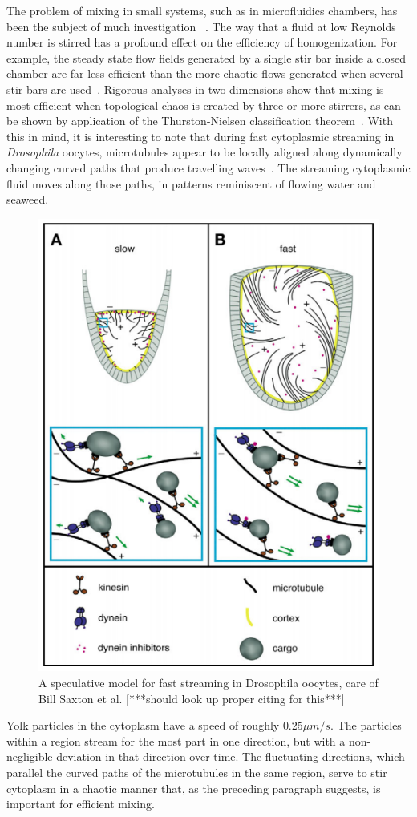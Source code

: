 \documentclass[11pt]{ucthesis}
\begin{document}
The problem of mixing in small systems, such as in microfluidics
chambers, has been the subject of much investigation ~\cite{Squires}. The
way that a fluid at low Reynolds number is stirred has a
profound effect on the efficiency of homogenization. For
example,  the steady state flow fields generated by a single
stir bar inside a closed chamber are far less efficient than
the more chaotic flows generated when  several stir bars are used~\cite{Aref,Aref2000}.
Rigorous analyses in two dimensions show that mixing is
most efficient when topological chaos is created by three or more
stirrers, as can be shown by application of the Thurston-Nielsen
classification theorem~\cite{Thurston,Fathi,Handel}.  With this in mind, it is
interesting to note that during fast cytoplasmic streaming in
{\em Drosophila} oocytes, microtubules appear to be locally aligned
along dynamically changing curved paths that produce travelling
waves~\cite{SerbusSaxton}.  
The streaming cytoplasmic fluid moves along those paths, in patterns reminiscent
of flowing water and seaweed.
\begin{figure}[htp]
\begin{center}
\includegraphics[width=0.5\hsize]{biomodel.png}
\caption{ 
A speculative model for fast streaming in Drosophila oocytes, care of Bill Saxton et al. [***should look up proper citing for this***]
}
\label{fig:spheres}
\end{center}
\end{figure}


Yolk particles in the
cytoplasm have a speed of roughly $0.25 \mu m/s$.  The particles
within a region stream for the most part in one direction,
but with a non-negligible deviation in that direction over
time. The fluctuating directions, which parallel the curved paths of
the microtubules in the same region, serve to stir cytoplasm
in a chaotic manner that, as the preceding paragraph suggests,
is important for efficient mixing.
\end{document}
